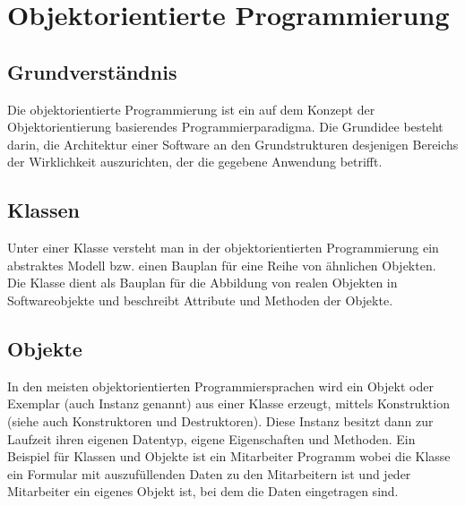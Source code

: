 \documentclass[12pt,a4paper]{article}
\begin{document}
\section{Objektorientierte Programmierung}

\subsection{Grundverständnis}
    Die objektorientierte Programmierung ist ein auf dem Konzept der Objektorientierung basierendes
    Programmierparadigma. Die Grundidee besteht darin, die Architektur einer Software an den Grundstrukturen desjenigen
    Bereichs der Wirklichkeit auszurichten, der die gegebene Anwendung betrifft.

\subsection{Klassen}
    Unter einer Klasse versteht man in der objektorientierten Programmierung ein abstraktes Modell bzw. einen Bauplan für eine Reihe von ähnlichen Objekten. Die Klasse dient als Bauplan für die Abbildung von realen Objekten in Softwareobjekte und beschreibt Attribute und Methoden der Objekte.

\subsection{Objekte}
    In den meisten objektorientierten Programmiersprachen wird ein Objekt oder Exemplar (auch Instanz genannt) aus einer Klasse erzeugt, mittels Konstruktion (siehe auch Konstruktoren und Destruktoren). Diese Instanz besitzt dann zur Laufzeit ihren eigenen Datentyp, eigene Eigenschaften und Methoden. Ein Beispiel für Klassen und Objekte ist ein Mitarbeiter Programm wobei die Klasse ein Formular mit auszufüllenden Daten zu den Mitarbeitern ist und jeder Mitarbeiter ein eigenes Objekt ist, bei dem die Daten eingetragen sind.
\end{document}
